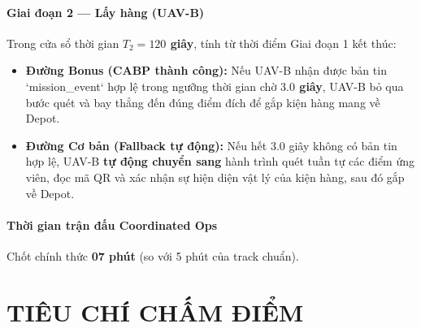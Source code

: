 \documentclass[12pt,a4paper]{article}
\begin{document}
\paragraph{Giai đoạn 2 — Lấy hàng (UAV-B)}
Trong cửa sổ thời gian \textbf{$T_2 = 120$ giây}, tính từ thời điểm Giai đoạn 1 kết thúc:
\begin{itemize}
\item \textbf{Đường Bonus (CABP thành công):} Nếu UAV-B nhận được bản tin `mission\_event` hợp lệ trong ngưỡng thời gian chờ \textbf{$3.0$ giây}, UAV-B bỏ qua bước quét và bay thẳng đến đúng điểm đích để gắp kiện hàng mang về Depot.
\item \textbf{Đường Cơ bản (Fallback tự động):} Nếu hết $3.0$ giây không có bản tin hợp lệ, UAV-B \textbf{tự động chuyển sang} hành trình quét tuần tự các điểm ứng viên, đọc mã QR và xác nhận sự hiện diện vật lý của kiện hàng, sau đó gắp về Depot.
\end{itemize}

\paragraph{Thời gian trận đấu Coordinated Ops}
Chốt chính thức \textbf{07 phút} (so với 5 phút của track chuẩn).

\section{TIÊU CHÍ CHẤM ĐIỂM}
\end{document}
